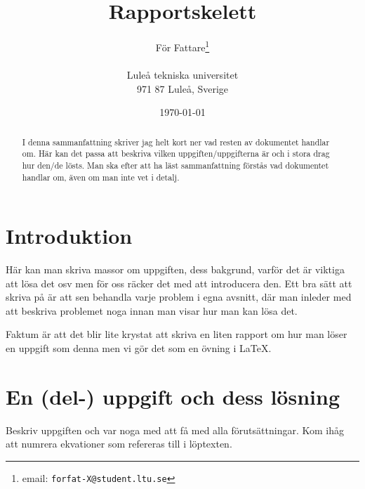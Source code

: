 \documentclass[a4paper,12pt]{article}
\title{Rapportskelett}
\author{För Fattare\thanks{email: \texttt{forfat-X@student.ltu.se}}\\  
        ~ \\
        Luleå tekniska universitet \\ 
        971 87 Luleå, Sverige}
\date{\today}
\begin{document}
\linenumbers


\maketitle


\begin{abstract}
  I denna sammanfattning skriver jag helt kort ner vad resten av
  dokumentet handlar om. Här kan det passa att beskriva vilken
  uppgiften/uppgifterna är och i stora drag hur den/de lösts.
  Man ska efter att ha läst sammanfattning förstås vad dokumentet
  handlar om, även om man inte vet i detalj. 
\end{abstract}


\section{Introduktion}
\label{sec:introduktion}


Här kan man skriva massor om uppgiften, dess bakgrund, varför det är
viktiga att lösa det osv men för oss räcker det med att introducera
den. Ett bra sätt att skriva på är att sen behandla varje problem i
egna avsnitt, där man inleder med att beskriva problemet noga innan
man visar hur man kan lösa det.


Faktum är att det blir lite krystat att skriva en liten rapport om hur
man löser en uppgift som denna men vi gör det som en övning i \LaTeX. 


\section{En (del-) uppgift och dess lösning}
\label{sec:uppg1}


Beskriv uppgiften och var noga med att få med alla förutsättningar.
Kom ihåg att numrera ekvationer som refereras till i löptexten.  
\end{document}
